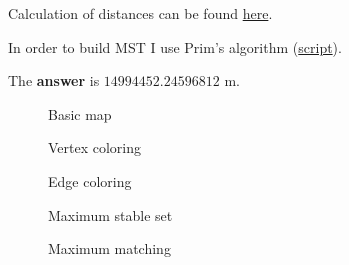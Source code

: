 \documentclass[12pt, a4paper]{article}
\begin{document}
\begin{enumerate}[label=\alph*)]
Calculation of distances can be found
\href{https://github.com/ablearthy-itmo-39828cf299f04949c86/discrete-math-2-hw-1/blob/100644/auto/mygraph/distances.py}{here}.

In order to build MST I use Prim's algorithm \cite{algoprim} (\href{https://github.com/ablearthy-itmo-39828cf299f04949c86/discrete-math-2-hw-1/blob/5337ff8/auto/mst.py}{script}).

The \textbf{answer} is \(14994452.24596812\) m.

\end{enumerate}



\begin{landscape}
\begin{figure}
\centering

\caption{Basic map}\label{fig:map_basic}
\end{figure}
\end{landscape}

\begin{landscape}
\begin{figure}
\centering

\caption{Vertex coloring}\label{fig:vertex_coloring_map}
\end{figure}
\end{landscape}

\begin{landscape}
\begin{figure}
\centering

\caption{Edge coloring}\label{fig:edge_coloring_map}
\end{figure}
\end{landscape}

\begin{landscape}
\begin{figure}
\centering

\caption{Maximum stable set}\label{fig:stable_set_map}
\end{figure}
\end{landscape}

\begin{landscape}
\begin{figure}
\centering

\caption{Maximum matching}\label{fig:matching_map}
\end{figure}
\end{landscape}
\end{document}
